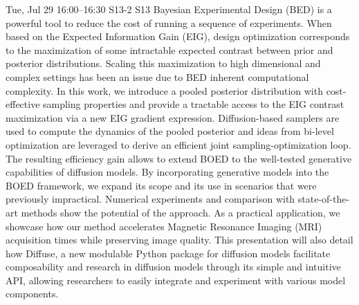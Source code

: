 \begin{talk}
  {}%
  {}%
  {}%
  {}%
  {}%
  {}%
  {Tue, Jul 29 16:00--16:30}%
  {S13-2}%
  {S13}%
    Bayesian  Experimental Design (BED) is a powerful tool to reduce the cost of running a sequence of experiments.
    When based on the Expected Information Gain (EIG), design optimization corresponds to the maximization of some intractable expected  contrast between prior and posterior distributions.
    Scaling this maximization to high dimensional and complex settings has been an issue due to BED inherent computational complexity.
    In this work, we introduce a pooled posterior distribution with cost-effective sampling properties and provide a tractable access to the EIG contrast maximization via a new EIG gradient expression. Diffusion-based samplers are used to compute the dynamics of the pooled posterior and ideas from bi-level optimization are leveraged to derive an efficient joint sampling-optimization loop.
    The resulting efficiency gain allows to extend BOED to the well-tested generative capabilities of diffusion models.
    By incorporating generative models into the BOED framework, we expand its scope and its use in scenarios that were previously impractical. Numerical experiments and comparison with state-of-the-art methods show the potential of the approach.
    As a practical application, we showcase how our method accelerates Magnetic Resonance Imaging (MRI) acquisition times while preserving image quality.
    This presentation will also detail how Diffuse, a new modulable Python package for diffusion models facilitate composability and research in diffusion models through its simple and intuitive API, allowing researchers to easily integrate and experiment with various model components.

\end{talk}

